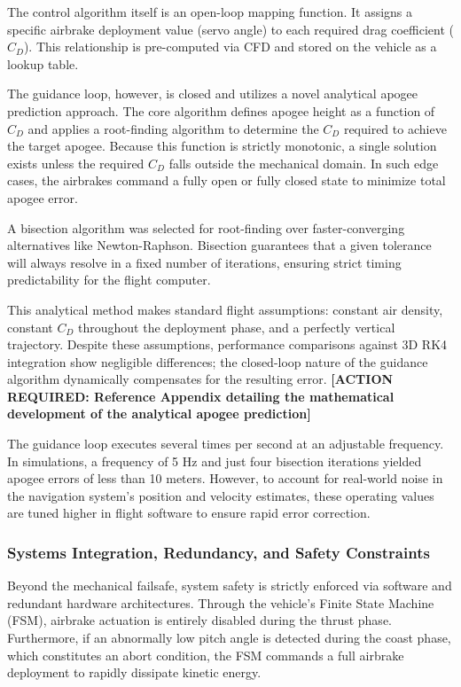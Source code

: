\documentclass[11pt, a4paper]{article} %
\begin{document}
The control algorithm itself is an open-loop mapping function. It assigns a specific airbrake deployment value (servo angle) to each required drag coefficient ($C_D$). This relationship is pre-computed via CFD and stored on the vehicle as a lookup table.

The guidance loop, however, is closed and utilizes a novel analytical apogee prediction approach. The core algorithm defines apogee height as a function of $C_D$ and applies a root-finding algorithm to determine the $C_D$ required to achieve the target apogee. Because this function is strictly monotonic, a single solution exists unless the required $C_D$ falls outside the mechanical domain. In such edge cases, the airbrakes command a fully open or fully closed state to minimize total apogee error.

A bisection algorithm was selected for root-finding over faster-converging alternatives like Newton-Raphson. Bisection guarantees that a given tolerance will always resolve in a fixed number of iterations, ensuring strict timing predictability for the flight computer.

This analytical method makes standard flight assumptions: constant air density, constant $C_D$ throughout the deployment phase, and a perfectly vertical trajectory. Despite these assumptions, performance comparisons against 3D RK4 integration show negligible differences; the closed-loop nature of the guidance algorithm dynamically compensates for the resulting error. \textbf{[ACTION REQUIRED: Reference Appendix detailing the mathematical development of the analytical apogee prediction]}

The guidance loop executes several times per second at an adjustable frequency. In simulations, a frequency of 5 Hz and just four bisection iterations yielded apogee errors of less than 10 meters. However, to account for real-world noise in the navigation system's position and velocity estimates, these operating values are tuned higher in flight software to ensure rapid error correction.

\subsubsection{Systems Integration, Redundancy, and Safety Constraints}

Beyond the mechanical failsafe, system safety is strictly enforced via software and redundant hardware architectures. Through the vehicle's Finite State Machine (FSM), airbrake actuation is entirely disabled during the thrust phase. Furthermore, if an abnormally low pitch angle is detected during the coast phase, which constitutes an abort condition, the FSM commands a full airbrake deployment to rapidly dissipate kinetic energy.
\end{document}
